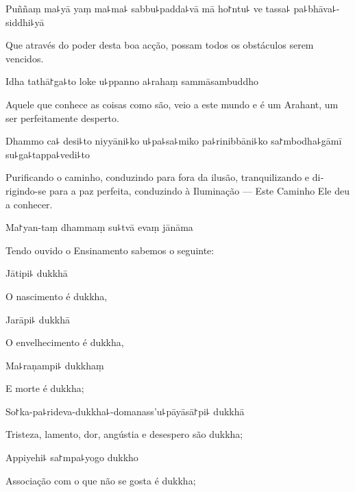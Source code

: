 Puññaṃ ma꜕yā yaṃ ma꜕ma꜕ sabbu꜕padda꜕vā mā ho꜓ntu꜕ ve tassa꜕ pa꜕bhāva꜕-siddhi꜕yā

\begin{english}
  Que através do poder desta boa acção, possam todos os obstáculos serem vencidos.
\end{english}

Idha tathā꜓ga꜕to loke u꜕ppanno a꜕rahaṃ sammāsambuddho

\begin{english}
  Aquele que conhece as coisas como são, veio a este mundo e é um Arahant, um ser perfeitamente desperto.
\end{english}

Dhammo ca꜕ desi꜕to niyyāni꜕ko u꜕pa꜕sa꜕miko pa꜕rinibbāni꜕ko sa꜓mbodha꜕gāmī su꜕ga꜕tappa꜕vedi꜕to

\begin{english}
  Purificando o caminho, conduzindo para fora da ilusão, tranquilizando e dirigindo-se para a paz perfeita, conduzindo à Iluminação  --- Este Caminho Ele deu a conhecer.
\end{english}

Ma꜓yan-taṃ dhammaṃ su꜕tvā evaṃ jānāma

\begin{english}
  Tendo ouvido o Ensinamento sabemos o seguinte:
\end{english}

Jātipi꜕ dukkhā

\begin{english}
  O nascimento é dukkha,
\end{english}

Jarāpi꜕ dukkhā

\begin{english}
  O envelhecimento é dukkha,
\end{english}

Ma꜕raṇampi꜕ dukkhaṃ

\begin{english}
  E morte é dukkha;
\end{english}

So꜓ka-pa꜕rideva-dukkha꜕-domanass'u꜕pāyāsā꜓pi꜕ dukkhā

\begin{english}
  Tristeza, lamento, dor, angústia e desespero são dukkha;
\end{english}

Appiyehi꜕ sa꜓mpa꜕yogo dukkho

\begin{english}
  Associação com o que não se gosta é dukkha;
\end{english}

